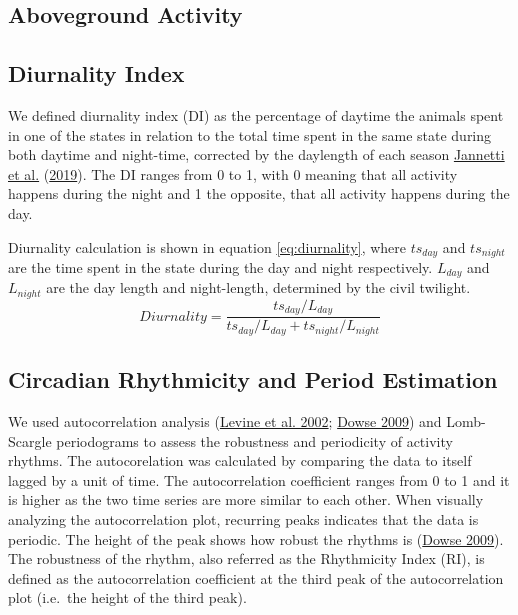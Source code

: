 \documentclass[english,msc,numbers,hidelinks]{coppe}
\begin{document}
  \hypertarget{aboveground-activity}{%
  \subsection{Aboveground Activity}\label{aboveground-activity}}

  \hypertarget{diurnality-index}{%
  \subsection{Diurnality Index}\label{diurnality-index}}

  We defined diurnality index (DI) as the percentage of daytime the animals spent in one of the states in relation to the total time spent in the same state during both daytime and night-time, corrected by the daylength of each season \protect\hyperlink{ref-jannetti2019}{Jannetti et al.} (\protect\hyperlink{ref-jannetti2019}{2019}). The DI ranges from 0 to 1, with 0 meaning that all activity happens during the night and 1 the opposite, that all activity happens during the day.

  Diurnality calculation is shown in equation \eqref{eq:diurnality}, where \(ts_{day}\) and \(ts_{night}\) are the time spent in the state during the day and night respectively. \(L_{day}\) and \(L_{night}\) are the day length and night-length, determined by the civil twilight.
  \begin{equation}
  Diurnality = \frac{ts_{day}/L_{day}}{ts_{day}/L_{day} + ts_{night}/L_{night}} \label{eq:diurnality}
  \end{equation}
  \hypertarget{circadian-rhythmicity-and-period-estimation}{%
  \subsection{Circadian Rhythmicity and Period Estimation}\label{circadian-rhythmicity-and-period-estimation}}

  We used autocorrelation analysis (\protect\hyperlink{ref-levine2002}{Levine et al. 2002}; \protect\hyperlink{ref-dowse2009}{Dowse 2009}) and Lomb-Scargle periodograms to assess the robustness and periodicity of activity rhythms. The autocorelation was calculated by comparing the data to itself lagged by a unit of time. The autocorrelation coefficient ranges from 0 to 1 and it is higher as the two time series are more similar to each other. When visually analyzing the autocorrelation plot, recurring peaks indicates that the data is periodic. The height of the peak shows how robust the rhythms is (\protect\hyperlink{ref-dowse2009}{Dowse 2009}). The robustness of the rhythm, also referred as the Rhythmicity Index (RI), is defined as the autocorrelation coefficient at the third peak of the autocorrelation plot (i.e.~the height of the third peak).
\end{document}
